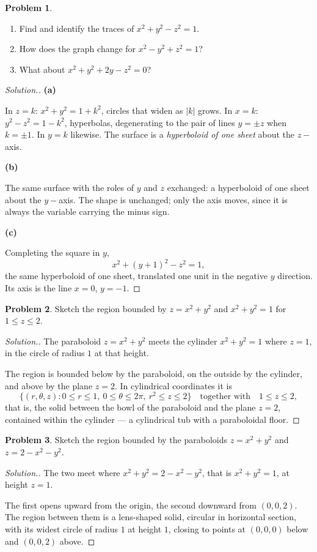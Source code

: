 \documentclass[11pt,a4paper]{article}
\theoremstyle{definition}
\newtheorem{problemx}{Problem}[subsection]
\newenvironment{problem}{\begin{problemx}}{\end{problemx}}
\newenvironment{solution}
  {\renewcommand{\qedsymbol}{}\begin{proof}[\textit{Solution}.]}
  {\end{proof}}
\newcommand{\subhead}[1]{%
  \par\medskip\noindent\textbf{#1}\par\nobreak\smallskip}
\begin{document}
\begin{problem}
\begin{enumerate}
\item[(a)] Find and identify the traces of $x^2+y^2-z^2 = 1$.
\item[(b)] How does the graph change for $x^2-y^2+z^2 = 1$?
\item[(c)] What about $x^2+y^2+2y-z^2 = 0$?
\end{enumerate}
\end{problem}
\begin{solution}
\subhead{(a)}
In $z=k$: $x^2+y^2 = 1+k^2$, circles that widen as $\left|k\right|$ grows.
In $x=k$: $y^2-z^2 = 1-k^2$, hyperbolas, degenerating to the pair of lines
$y=\pm z$ when $k=\pm 1$. In $y=k$ likewise. The surface is a
\emph{hyperboloid of one sheet} about the $z-$axis.

\subhead{(b)}
The same surface with the roles of $y$ and $z$ exchanged: a hyperboloid of one
sheet about the $y-$axis. The shape is unchanged; only the axis moves, since it
is always the variable carrying the minus sign.

\subhead{(c)}
Completing the square in $y$,
\[x^2+(y+1)^2-z^2 = 1 ,\]
the same hyperboloid of one sheet, translated one unit in the negative $y$
direction. Its axis is the line $x=0$, $y=-1$.
\end{solution}

\begin{problem}
Sketch the region bounded by $z = x^2+y^2$ and $x^2+y^2 = 1$ for
$1\leq z\leq 2$.
\end{problem}
\begin{solution}
The paraboloid $z = x^2+y^2$ meets the cylinder $x^2+y^2 = 1$ where $z=1$, in
the circle of radius $1$ at that height.

The region is bounded below by the paraboloid, on the outside by the cylinder,
and above by the plane $z=2$. In cylindrical coordinates it is
\[\{(r,\theta,z): 0\leq r\leq 1,\ 0\leq\theta\leq 2\pi,\ r^2\leq z\leq 2\}
\quad\text{together with}\quad 1\leq z\leq 2 ,\]
that is, the solid between the bowl of the paraboloid and the plane $z=2$,
contained within the cylinder --- a cylindrical tub with a paraboloidal floor.
\end{solution}

\begin{problem}
Sketch the region bounded by the paraboloids $z = x^2+y^2$ and
$z = 2-x^2-y^2$.
\end{problem}
\begin{solution}
The two meet where $x^2+y^2 = 2-x^2-y^2$, that is $x^2+y^2 = 1$, at height
$z = 1$.

The first opens upward from the origin, the second downward from $(0,0,2)$. The
region between them is a lens-shaped solid, circular in horizontal section, with
its widest circle of radius $1$ at height $1$, closing to points at $(0,0,0)$
below and $(0,0,2)$ above.
\end{solution}
\end{document}
